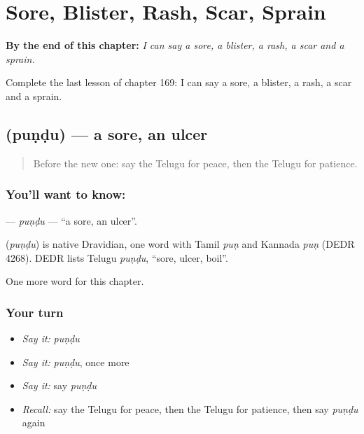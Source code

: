 
\chapter{Sore, Blister, Rash, Scar, Sprain}
\label{ch:te-sore-blister-rash-scar-sprain}

\begin{chapteropening}
\textbf{By the end of this chapter:} \emph{I can say a sore, a blister, a rash, a scar and a sprain.}

Complete the last lesson of chapter 169: I can say a sore, a blister, a rash, a scar and a sprain.
\end{chapteropening}

\section[\texorpdfstring{\te{పుండు} (puṇḍu)}{పుండు (puṇḍu)}]{ (puṇḍu) — a sore, an ulcer}

\label{lesson:TE-C169-pundu}



\begin{quote}
Before the new one: say the Telugu for peace, then the Telugu for patience.
\end{quote}

\subsection*{You'll want to know: }
\textbf{} — \emph{puṇḍu} — \textquotedblleft{}a sore, an ulcer\textquotedblright{}.

\begin{cousinweb}
\textbf{} (\emph{puṇḍu}) is native Dravidian, one word with Tamil \emph{puṇ} and Kannada \emph{puṇ} (DEDR 4268). DEDR lists Telugu \emph{puṇḍu}, \textquotedblleft{}sore, ulcer, boil\textquotedblright{}.
\end{cousinweb}

\begin{grammarlens}[title={What you've built}]
One more word for this chapter.
\end{grammarlens}

\subsection*{Your turn}
\begin{itemize}
\raggedright
  \item \emph{Say it:} \emph{puṇḍu}
  \item \emph{Say it:} \emph{puṇḍu}, once more
  \item \emph{Say it:} say \emph{puṇḍu}
  \item \emph{Recall:} say the Telugu for peace, then the Telugu for patience, then say \emph{puṇḍu} again
\end{itemize}

